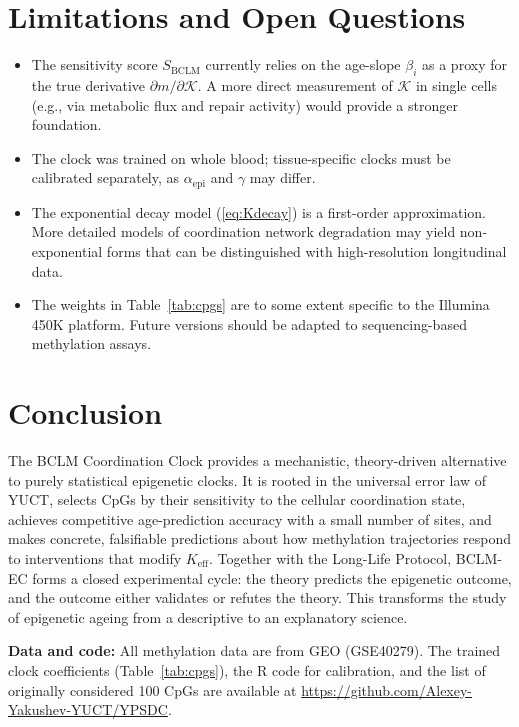\documentclass[12pt,a4paper]{article}
\newcommand{\REL}{\mathcal{K}}          %
\begin{document}
	\section{Limitations and Open Questions}
	\label{sec:limitations}
	\begin{itemize}
		\item The sensitivity score \(S_{\mathrm{BCLM}}\) currently relies on the age-slope \(\beta_i\) as a proxy for the true derivative \(\partial m/\partial \REL\). A more direct measurement of \(\REL\) in single cells (e.g., via metabolic flux and repair activity) would provide a stronger foundation.
		\item The clock was trained on whole blood; tissue-specific clocks must be calibrated separately, as \(\alpha_{\mathrm{epi}}\) and \(\gamma\) may differ.
		\item The exponential decay model (\ref{eq:Kdecay}) is a first-order approximation. More detailed models of coordination network degradation may yield non-exponential forms that can be distinguished with high-resolution longitudinal data.
		\item The weights in Table~\ref{tab:cpgs} are to some extent specific to the Illumina 450K platform. Future versions should be adapted to sequencing-based methylation assays.
	\end{itemize}
	
	\section{Conclusion}
	\label{sec:conclusion}
	The BCLM Coordination Clock provides a mechanistic, theory-driven alternative to purely statistical epigenetic clocks. It is rooted in the universal error law of YUCT, selects CpGs by their sensitivity to the cellular coordination state, achieves competitive age-prediction accuracy with a small number of sites, and makes concrete, falsifiable predictions about how methylation trajectories respond to interventions that modify \(K_{\mathrm{eff}}\). Together with the Long-Life Protocol, BCLM-EC forms a closed experimental cycle: the theory predicts the epigenetic outcome, and the outcome either validates or refutes the theory. This transforms the study of epigenetic ageing from a descriptive to an explanatory science.
	
	\vspace{0.5cm}
	\noindent\textbf{Data and code:} All methylation data are from GEO (GSE40279). The trained clock coefficients (Table~\ref{tab:cpgs}), the R code for calibration, and the list of originally considered 100 CpGs are available at \url{https://github.com/Alexey-Yakushev-YUCT/YPSDC}.
	
\end{document}
